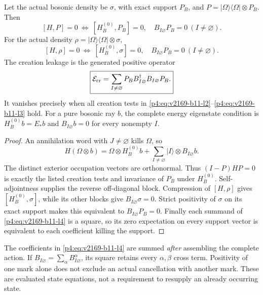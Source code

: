 \documentclass[12pt,a4paper]{article}
\begin{document}
\begin{theorem}
\label{p4:v2169:b11:thm:normalstate}
Let the actual bosonic density be $\sigma$, with exact support $P_B$, and
$P=|\Omega\rangle\langle\Omega|\otimes P_B$. Then
\begin{equation}
 \boxed{[H,P]=0\ \Longleftrightarrow\
 [H_B^{(0)},P_B]=0,\quad B_{I\varnothing}P_B=0\ (I\ne\varnothing).}
 \label{p4:eq:v2169-b11-l2}
\end{equation}
For the actual density $\rho=|\Omega\rangle\langle\Omega|\otimes\sigma$,
\begin{equation}
 \boxed{[H,\rho]=0\ \Longleftrightarrow\
 [H_B^{(0)},\sigma]=0,\quad B_{I\varnothing}P_B=0\ (I\ne\varnothing).}
 \label{p4:eq:v2169-b11-l3}
\end{equation}
The creation leakage is the generated positive operator
\begin{equation}
 \boxed{\mathcal E_{\rm cr}
 =\sum_{I\ne\varnothing}P_BB_{I\varnothing}^\dagger
                  B_{I\varnothing}P_B.}
 \label{p4:eq:v2169-b11-l4}
\end{equation}
It vanishes precisely when all creation tests in \eqref{p4:eq:v2169-b11-l2}--\eqref{p4:eq:v2169-b11-l3} hold.
For a pure bosonic ray $b$, the complete energy eigenstate condition is
$H_B^{(0)}b=E_*b$ and $B_{I\varnothing}b=0$ for every nonempty $I$.
\end{theorem}
\begin{proof}
An annihilation word with $J\ne\varnothing$ kills $\Omega$, so
\[
 H(\Omega\otimes b)=\Omega\otimes H_B^{(0)}b+
            \sum_{I\ne\varnothing}|I\rangle\otimes B_{I\varnothing}b.
\]
The distinct exterior occupation vectors are orthonormal. Thus $(I-P)HP=0$
is exactly the listed creation tests and invariance of $P_B$ under $H_B^{(0)}$.
Self-adjointness supplies the reverse off-diagonal block. Compression of
$[H,\rho]$ gives $[H_B^{(0)},\sigma]$, while its other blocks give
$B_{I\varnothing}\sigma=0$. Strict positivity of $\sigma$ on its exact
support makes this equivalent to $B_{I\varnothing}P_B=0$.
Finally each summand of \eqref{p4:eq:v2169-b11-l4} is a square, so its zero expectation on every
support vector is equivalent to each coefficient killing the support.
\end{proof}

The coefficients in \eqref{p4:eq:v2169-b11-l4} are summed \emph{after} assembling the complete
action. If $B_{I\varnothing}=\sum_\alpha B^\alpha_{I\varnothing}$, its square
retains every $\alpha,\beta$ cross term. Positivity of one mark alone does
not exclude an actual cancellation with another mark. These are evaluated
state equations, not a requirement to resupply an already occurring state.
\end{document}
